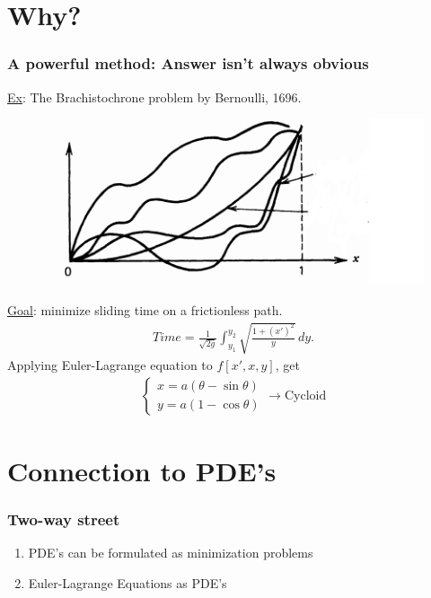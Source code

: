\documentclass{beamer}
\theoremstyle{definition}
\begin{document}


\section{Why?}
\begin{frame}
\frametitle{A powerful method: Answer isn't always obvious}
\pause
\underline{Ex}: The Brachistochrone problem by Bernoulli, 1696. 
\begin{figure}[h!]
	\centering
	\includegraphics[scale=0.3]{brac.png}
\end{figure} 
\underline{Goal}: minimize sliding time on a frictionless path.
\pause
\begin{align*}
Time = \frac{1}{\sqrt{2g}}\int^{y_2}_{y_1}\sqrt{\frac{1+(x')^2}{y}}\,dy.
\end{align*}
\pause
Applying Euler-Lagrange equation to $f[x',x,y]$, get
\pause
\begin{align*}
\begin{cases}
x = a(\theta - \sin\theta)\\
y = a(1-\cos\theta)
\end{cases} \longrightarrow \text{Cycloid}
\end{align*}
\end{frame}


\section{Connection to PDE's}

\begin{frame}
\frametitle{Two-way street}

\begin{enumerate}
	\item PDE's can be formulated as minimization problems
	\pause
	\item Euler-Lagrange Equations as PDE's
\end{enumerate}

\end{frame}
\end{document}
